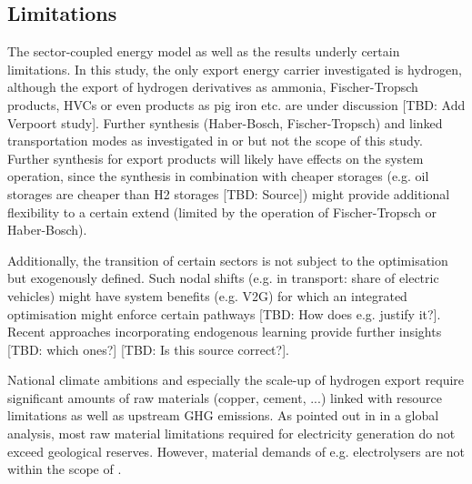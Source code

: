 \subsection{Limitations}
\label{subsec:limitations}

The sector-coupled energy model as well as the results underly certain limitations. In this study, the only export energy carrier investigated is hydrogen, although the export of hydrogen derivatives as ammonia, Fischer-Tropsch products, HVCs or even products as pig iron etc. are under discussion [TBD: Add Verpoort study]. Further synthesis (Haber-Bosch, Fischer-Tropsch) and linked transportation modes as investigated in \cite{Hampp2021} or \cite{Galimova2023} but not the scope of this study. Further synthesis for export products will likely have effects on the system operation, since the synthesis in combination with cheaper storages (e.g. oil storages are cheaper than H2 storages [TBD: Source]) might provide additional flexibility to a certain extend (limited by the operation of Fischer-Tropsch or Haber-Bosch).

Additionally, the transition of certain sectors is not subject to the optimisation but exogenously defined. Such nodal shifts (e.g. in transport: share of electric vehicles) might have system benefits (e.g. V2G) for which an integrated optimisation might enforce certain pathways [TBD: How does e.g. \cite{Neumann2022} justify it?]. Recent approaches incorporating endogenous learning provide further insights [TBD: which ones?] \cite{Zeyen2023} [TBD: Is this source correct?].

National climate ambitions and especially the scale-up of hydrogen export require significant amounts of raw materials (copper, cement, ...) linked with resource limitations as well as upstream GHG emissions. As pointed out in \cite{Wang2023} in a global analysis, most raw material limitations required for electricity generation do not exceed geological reserves. However, material demands of e.g. electrolysers are not within the scope of \cite{Wang2023}.


